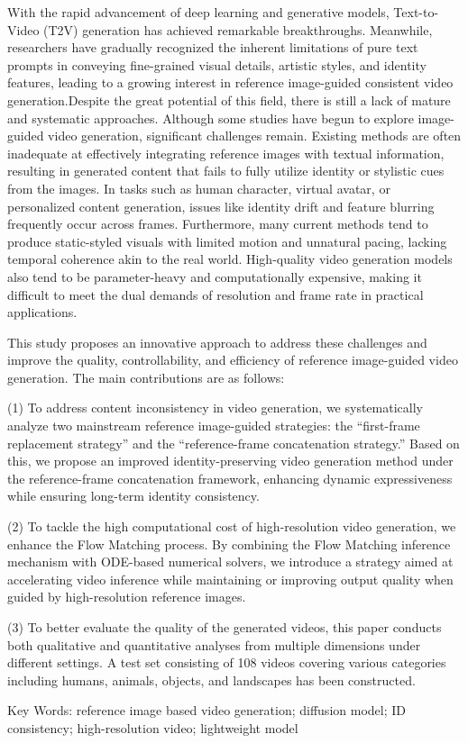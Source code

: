 With the rapid advancement of deep learning and generative models, Text-to-Video (T2V) generation has achieved remarkable breakthroughs. Meanwhile, researchers have gradually recognized the inherent limitations of pure text prompts in conveying fine-grained visual details, artistic styles, and identity features, leading to a growing interest in reference image-guided consistent video generation.Despite the great potential of this field, there is still a lack of mature and systematic approaches. Although some studies have begun to explore image-guided video generation, significant challenges remain. Existing methods are often inadequate at effectively integrating reference images with textual information, resulting in generated content that fails to fully utilize identity or stylistic cues from the images. In tasks such as human character, virtual avatar, or personalized content generation, issues like identity drift and feature blurring frequently occur across frames. Furthermore, many current methods tend to produce static-styled visuals with limited motion and unnatural pacing, lacking temporal coherence akin to the real world. High-quality video generation models also tend to be parameter-heavy and computationally expensive, making it difficult to meet the dual demands of resolution and frame rate in practical applications.

This study proposes an innovative approach to address these challenges and improve the quality, controllability, and efficiency of reference image-guided video generation. The main contributions are as follows:

(1) To address content inconsistency in video generation, we systematically analyze two mainstream reference image-guided strategies: the “first-frame replacement strategy” and the “reference-frame concatenation strategy.” Based on this, we propose an improved identity-preserving video generation method under the reference-frame concatenation framework, enhancing dynamic expressiveness while ensuring long-term identity consistency.

(2) To tackle the high computational cost of high-resolution video generation, we enhance the Flow Matching process. By combining the Flow Matching inference mechanism with ODE-based numerical solvers, we introduce a strategy aimed at accelerating video inference while maintaining or improving output quality when guided by high-resolution reference images.

(3) To better evaluate the quality of the generated videos, this paper conducts both qualitative and quantitative analyses from multiple dimensions under different settings. A test set consisting of 108 videos covering various categories including humans, animals, objects, and landscapes has been constructed.

\noindent
Key Words: reference image based video generation; diffusion model; ID consistency; high-resolution video; lightweight model
